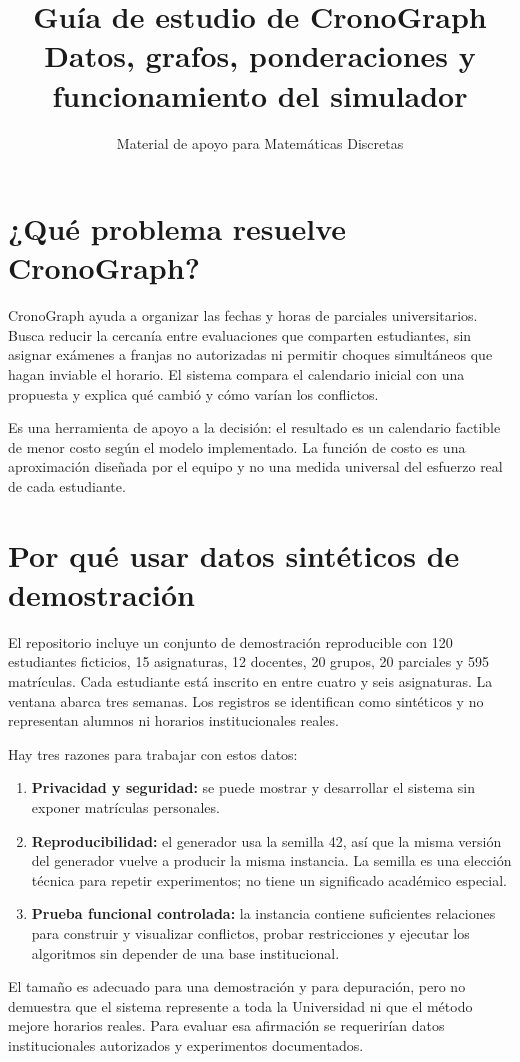 \documentclass[11pt,a4paper]{article}
\title{\textbf{Guía de estudio de CronoGraph}\\
\large Datos, grafos, ponderaciones y funcionamiento del simulador}
\author{Material de apoyo para Matemáticas Discretas}
\date{}
\begin{document}
\maketitle

\section{¿Qué problema resuelve CronoGraph?}
CronoGraph ayuda a organizar las fechas y horas de parciales universitarios. Busca reducir la cercanía entre evaluaciones que comparten estudiantes, sin asignar exámenes a franjas no autorizadas ni permitir choques simultáneos que hagan inviable el horario. El sistema compara el calendario inicial con una propuesta y explica qué cambió y cómo varían los conflictos.

Es una herramienta de apoyo a la decisión: el resultado es un calendario factible de menor costo según el modelo implementado. La función de costo es una aproximación diseñada por el equipo y no una medida universal del esfuerzo real de cada estudiante.

\section{Por qué usar datos sintéticos de demostración}
El repositorio incluye un conjunto de demostración reproducible con 120 estudiantes ficticios, 15 asignaturas, 12 docentes, 20 grupos, 20 parciales y 595 matrículas. Cada estudiante está inscrito en entre cuatro y seis asignaturas. La ventana abarca tres semanas. Los registros se identifican como sintéticos y no representan alumnos ni horarios institucionales reales.

Hay tres razones para trabajar con estos datos:
\begin{enumerate}[leftmargin=*]
    \item \textbf{Privacidad y seguridad:} se puede mostrar y desarrollar el sistema sin exponer matrículas personales.
    \item \textbf{Reproducibilidad:} el generador usa la semilla 42, así que la misma versión del generador vuelve a producir la misma instancia. La semilla es una elección técnica para repetir experimentos; no tiene un significado académico especial.
    \item \textbf{Prueba funcional controlada:} la instancia contiene suficientes relaciones para construir y visualizar conflictos, probar restricciones y ejecutar los algoritmos sin depender de una base institucional.
\end{enumerate}
El tamaño es adecuado para una demostración y para depuración, pero no demuestra que el sistema represente a toda la Universidad ni que el método mejore horarios reales. Para evaluar esa afirmación se requerirían datos institucionales autorizados y experimentos documentados.
\end{document}
